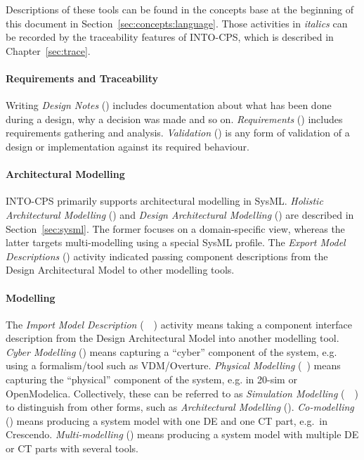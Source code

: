 Descriptions of these tools can be found in the concepts base at the beginning of this document in Section~\ref{sec:concepts:language}. Those activities in \emph{italics} can be recorded by the traceability features of INTO-CPS, which is described in Chapter~\ref{sec:trace}.

\newpage
\paragraph{Requirements and Traceability}

Writing \emph{Design Notes} (\INTOCPS) includes documentation about what has been done during a design, why a decision was made and so on. \emph{Requirements} (\Modelio) includes requirements gathering and analysis. \emph{Validation} (\INTOCPS) is any form of validation of a design or implementation against its required behaviour.

\paragraph{Architectural Modelling}

INTO-CPS primarily supports architectural modelling in SysML. \emph{Holistic Architectural Modelling} (\Modelio) and \emph{Design Architectural Modelling} (\Modelio) are described in Section~\ref{sec:sysml}. The former focuses on a domain-specific view, whereas the latter targets multi-modelling using a special SysML profile. The \emph{Export Model Descriptions} (\Modelio) activity indicated passing component descriptions from the Design Architectural Model to other modelling tools.

\paragraph{Modelling}

The \emph{Import Model Description} (\Overture~\TwentySim~\OpenModelica) activity means taking a component interface description from the Design Architectural Model into another modelling tool. \emph{Cyber Modelling} (\Overture) means capturing a ``cyber'' component of the system, e.g. using a formalism/tool such as VDM/Overture. \emph{Physical Modelling} (\TwentySim~\OpenModelica) means capturing the ``physical'' component of the system, e.g. in 20-sim  or OpenModelica. Collectively, these can be referred to as \emph{Simulation Modelling} (\Overture~\TwentySim~\OpenModelica) to distinguish from other forms, such as \emph{Architectural Modelling} (\Modelio). \emph{Co-modelling} (\Crescendo) means producing a system model with one DE and one CT part, e.g.\ in Crescendo. \emph{Multi-modelling} (\INTOCPS) means producing a system model with multiple DE or CT parts with several tools.

